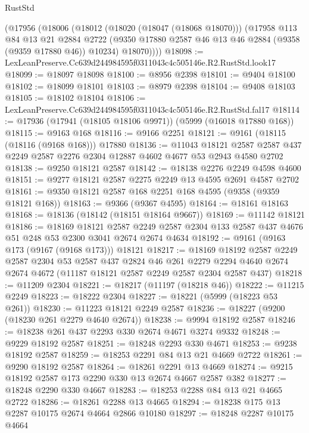 \begin{lexlean}{RustStd}
\begin{coremodule}
    (@17956
      (@18006
        (@18012
          (@18020 (@18047 (@18068 @18070)))
          (@17958
            @113
            @84
            @13
            @21
            @2884
            @2722
            (@9350 @17880 @2587 @46 @13 @46 @2884 (@9358 (@9359 @17880 @46)) @10234)
            @18070))))
@18098 := LexLeanPreserve.Cc639d244984595f0311043c4c505146e.R2.RustStd.look17
@18099 := @18097 @18098
@18100 := @8956 @2398
@18101 := @9404 @18100
@18102 := @18099 @18101
@18103 := @8979 @2398
@18104 := @9408 @18103
@18105 := @18102 @18104
@18106 := LexLeanPreserve.Cc639d244984595f0311043c4c505146e.R2.RustStd.fal17
@18114 := @17936 (@17941 (@18105 @18106 @9971)) (@5999 (@16018 @17880 @168))
@18115 := @9163 @168
@18116 := @9166 @2251
@18121 := @9161 (@18115 (@18116 (@9168 @168))) @17880
@18136 := @11043
    @18121
    @2587
    @2587
    @437
    @2249
    @2587
    @2276
    @2304
    @12887
    @4602
    @4677
    @53
    @2943
    @4580
    @2702
@18138 := @9250 @18121 @2587
@18142 := @18138 @2276 @2249 @4598 @4600
@18151 := @9277 @18121 @2587 @2275 @2249 @13 @4595 @2691 @4587 @2702
@18161 := @9350 @18121 @2587 @168 @2251 @168 @4595 (@9358 (@9359 @18121 @168))
@18163 := @9366 (@9367 @4595)
@18164 := @18161 @18163
@18168 := @18136 (@18142 (@18151 @18164 @9667))
@18169 := @11142 @18121
@18186 := @18169
    @18121
    @2587
    @2249
    @2587
    @2304
    @133
    @2587
    @437
    @4676
    @51
    @248
    @53
    @2300
    @3041
    @2674
    @2674
    @4634
@18192 := @9161 (@9163 @173 (@9167 (@9168 @173))) @18121
@18217 := @18169
    @18192
    @2587
    @2249
    @2587
    @2304
    @53
    @2587
    @437
    @2824
    @46
    @261
    @2279
    @2294
    @4640
    @2674
    @2674
    @4672
    (@11187 @18121 @2587 @2249 @2587 @2304 @2587 @437)
@18218 := @11209 @2304
@18221 := @18217 (@11197 (@18218 @46))
@18222 := @11215 @2249
@18223 := @18222 @2304
@18227 := @18221 (@5999 (@18223 @53 @261))
@18230 := @11223 @18121 @2249 @2587
@18236 := @18227 (@9200 (@18230 @261 @2279 @4640 @2674))
@18238 := @9994 @18192 @2587
@18246 := @18238 @261 @437 @2293 @330 @2674 @4671 @3274 @9332
@18248 := @9229 @18192 @2587
@18251 := @18248 @2293 @330 @4671
@18253 := @9238 @18192 @2587
@18259 := @18253 @2291 @84 @13 @21 @4669 @2722
@18261 := @9290 @18192 @2587
@18264 := @18261 @2291 @13 @4669
@18274 := @9215 @18192 @2587 @173 @2290 @330 @13 @2674 @4667 @2587 @382
@18277 := @18248 @2290 @330 @4667
@18283 := @18253 @2288 @84 @13 @21 @4665 @2722
@18286 := @18261 @2288 @13 @4665
@18294 := @18238 @175 @13 @2287 @10175 @2674 @4664 @2866 @10180
@18297 := @18248 @2287 @10175 @4664

\end{coremodule}
\end{lexlean}
